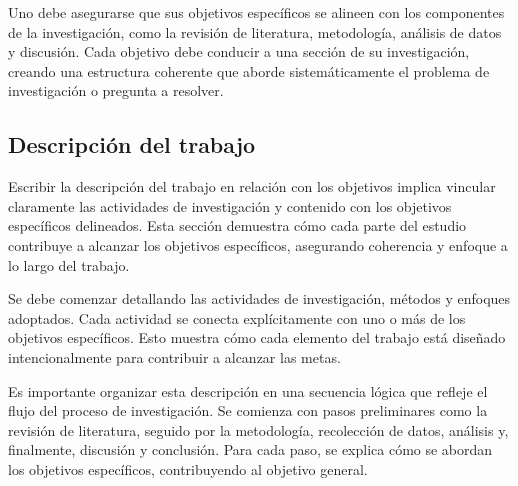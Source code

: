 Uno debe asegurarse que sus objetivos específicos se alineen con los componentes de la investigación, como la revisión de literatura, metodología, análisis de datos y discusión. Cada objetivo debe conducir a una sección de su investigación, creando una estructura coherente que aborde sistemáticamente el problema de investigación o pregunta a resolver.


\subsection{Descripción del trabajo}
Escribir la descripción del trabajo en relación con los objetivos implica vincular claramente las actividades de investigación y contenido con los objetivos específicos delineados. Esta sección demuestra cómo cada parte del estudio contribuye a alcanzar los objetivos específicos, asegurando coherencia y enfoque a lo largo del trabajo.

Se debe comenzar detallando las actividades de investigación, métodos y enfoques adoptados. Cada actividad se conecta explícitamente con uno o más de los objetivos específicos. Esto muestra cómo cada elemento del trabajo está diseñado intencionalmente para contribuir a alcanzar las metas.

Es importante organizar esta descripción en una secuencia lógica que refleje el flujo del proceso de investigación. Se comienza con pasos preliminares como la revisión de literatura, seguido por la metodología, recolección de datos, análisis y, finalmente, discusión y conclusión. Para cada paso, se explica cómo se abordan los objetivos específicos, contribuyendo al objetivo general.


